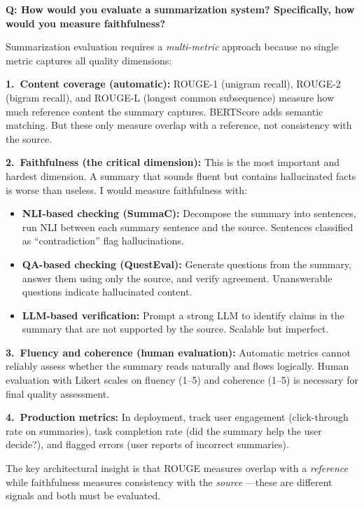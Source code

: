 \begin{interviewq}
\textbf{Q: How would you evaluate a summarization system? Specifically, how would
you measure faithfulness?}

 \quad {} \quad \badgefreq{\freqhigh}

\stronganswer
Summarization evaluation requires a \emph{multi-metric} approach because no
single metric captures all quality dimensions:

\textbf{1.\ Content coverage (automatic):}
ROUGE-1 (unigram recall), ROUGE-2 (bigram recall), and ROUGE-L (longest common
subsequence) measure how much reference content the summary captures.  BERTScore
adds semantic matching.  But these only measure overlap with a reference, not
consistency with the source.

\textbf{2.\ Faithfulness (the critical dimension):}
This is the most important and hardest dimension.  A summary that sounds fluent
but contains hallucinated facts is worse than useless.  I would measure
faithfulness with:
\begin{itemize}
    \item \textbf{NLI-based checking (SummaC):} Decompose the summary into
          sentences, run NLI between each summary sentence and the source.
          Sentences classified as ``contradiction'' flag hallucinations.
    \item \textbf{QA-based checking (QuestEval):} Generate questions from the
          summary, answer them using only the source, and verify agreement.
          Unanswerable questions indicate hallucinated content.
    \item \textbf{LLM-based verification:} Prompt a strong LLM to identify
          claims in the summary that are not supported by the source.  Scalable
          but imperfect.
\end{itemize}

\textbf{3.\ Fluency and coherence (human evaluation):}
Automatic metrics cannot reliably assess whether the summary reads naturally and
flows logically.  Human evaluation with Likert scales on fluency (1--5) and
coherence (1--5) is necessary for final quality assessment.

\textbf{4.\ Production metrics:}
In deployment, track user engagement (click-through rate on summaries), task
completion rate (did the summary help the user decide?), and flagged errors
(user reports of incorrect summaries).

The key architectural insight is that ROUGE measures overlap with a
\emph{reference} while faithfulness measures consistency with the \emph{source}
---these are different signals and both must be evaluated.


\end{interviewq}
